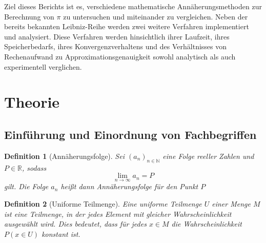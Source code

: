 \documentclass{scrartcl}
\newtheorem{definition}{Definition}
\theoremstyle{definition}
\newtheorem{approximation sequence}{Annäherungsfolge}
\begin{document}
Ziel dieses Berichts ist es, verschiedene mathematische Annäherungsmethoden zur
Berechnung von \(\pi\) zu untersuchen und miteinander zu vergleichen. Neben der
bereits bekannten Leibniz-Reihe werden zwei weitere Verfahren implementiert und
analysiert. Diese Verfahren werden hinsichtlich ihrer Laufzeit, ihres
Speicherbedarfs, ihres Konvergenzverhaltens und des Verhältnisses von
Rechenaufwand zu Approximationsgenauigkeit sowohl analytisch als auch
experimentell verglichen.

\section{Theorie}

\subsection{Einführung und Einordnung von Fachbegriffen}

\begin{definition}[Annäherungsfolge]
    Sei \((a_n)_{n \in \mathbb{N}}\) eine Folge reeller Zahlen und \(P \in
    \mathbb{R}\), sodass
    \[\lim_{n \to \infty} a_n = P \] gilt. Die Folge \(a_n\) heißt dann Annäherungsfolge für den Punkt \(P\)
\end{definition}

\begin{definition}[Uniforme Teilmenge]
    Eine uniforme Teilmenge \(U\) einer Menge \(M\) ist eine Teilmenge, in der
    jedes Element mit gleicher Wahrscheinlichkeit ausgewählt wird.
    Dies bedeutet, dass für jedes \(x \in M\) die Wahrscheinlichkeit \(P(x \in U)\)
    konstant ist.
\end{definition}
\end{document}
